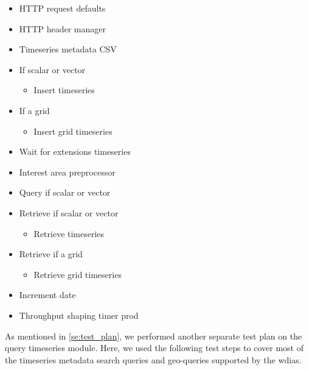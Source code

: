 \begin{itemize}
    \item HTTP request defaults
    \item HTTP header manager
    \item Timeseries metadata CSV
    \item If scalar or vector
        \begin{itemize}
            \item Insert timeseries
        \end{itemize}
    \item If a grid
    \begin{itemize}
        \item Insert grid timeseries
    \end{itemize}
    \item Wait for extensions timeseries
    \item Interest area preprocessor
    \item Query if scalar or vector
    \item Retrieve if scalar or vector
        \begin{itemize}
            \item Retrieve timeseries
        \end{itemize}
    \item Retrieve if a grid
    \begin{itemize}
        \item Retrieve grid timeseries
    \end{itemize}
    \item Increment date
    \item Throughput shaping timer prod
\end{itemize}

As mentioned in \cref{se:test_plan}, we performed another separate test plan on the query timeseries module. Here, we used the following test steps to cover most of the timeseries metadata search queries and geo-queries supported by the \acrshort{wdias}.


